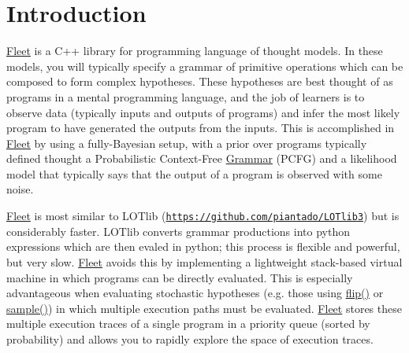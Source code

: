 \hypertarget{index_intro_sec}{}\section{Introduction}\label{index_intro_sec}
\hyperlink{namespace_fleet}{Fleet} is a C++ library for programming language of thought models. In these models, you will typically specify a grammar of primitive operations which can be composed to form complex hypotheses. These hypotheses are best thought of as programs in a mental programming language, and the job of learners is to observe data (typically inputs and outputs of programs) and infer the most likely program to have generated the outputs from the inputs. This is accomplished in \hyperlink{namespace_fleet}{Fleet} by using a fully-\/\+Bayesian setup, with a prior over programs typically defined thought a Probabilistic Context-\/\+Free \hyperlink{class_grammar}{Grammar} (P\+C\+FG) and a likelihood model that typically says that the output of a program is observed with some noise.

\hyperlink{namespace_fleet}{Fleet} is most similar to L\+O\+Tlib (\href{https://github.com/piantado/LOTlib3}{\tt https\+://github.\+com/piantado/\+L\+O\+Tlib3}) but is considerably faster. L\+O\+Tlib converts grammar productions into python expressions which are then evaled in python; this process is flexible and powerful, but very slow. \hyperlink{namespace_fleet}{Fleet} avoids this by implementing a lightweight stack-\/based virtual machine in which programs can be directly evaluated. This is especially advantageous when evaluating stochastic hypotheses (e.\+g. those using \hyperlink{_random_8h_ae295082303ce2024a3de1c53dc99568e}{flip()} or \hyperlink{_random_8h_aeff9c1a005ab63ebd334bcf0ea80a036}{sample()}) in which multiple execution paths must be evaluated. \hyperlink{namespace_fleet}{Fleet} stores these multiple execution traces of a single program in a priority queue (sorted by probability) and allows you to rapidly explore the space of execution traces.

